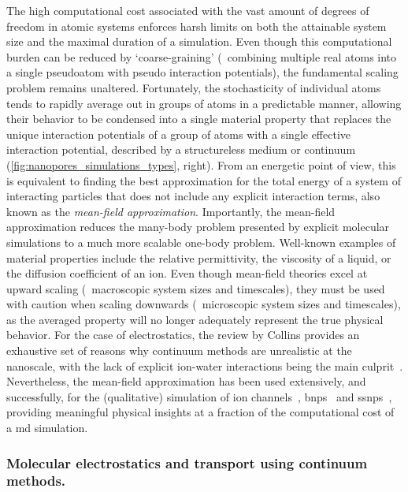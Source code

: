 The high computational cost associated with the vast amount of degrees of freedom in atomic systems enforces
harsh limits on both the attainable system size and the maximal duration of a simulation. Even though this
computational burden can be reduced by `coarse-graining' (\ie~combining multiple real atoms into a single
pseudoatom with pseudo interaction potentials), the fundamental scaling problem remains unaltered.
Fortunately, the stochasticity of individual atoms tends to rapidly average out in groups of atoms in a
predictable manner, allowing their behavior to be condensed into a single material property that replaces the
unique interaction potentials of a group of atoms with a single effective interaction potential, described by
a structureless medium or continuum (\cref{fig:nanopores_simulations_types}, right). From an energetic
point of view, this is equivalent to finding the best approximation for the total energy of a system of
interacting particles that does not include any explicit interaction terms, also known as the \emph{mean-field
approximation}. Importantly, the mean-field approximation reduces the many-body problem presented by explicit
molecular simulations to a much more scalable one-body problem. Well-known examples of material properties
include the relative permittivity, the viscosity of a liquid, or the diffusion coefficient of an ion. Even
though mean-field theories excel at upward scaling (\ie~macroscopic system sizes and timescales), they must be
used with caution when scaling downwards (\ie~microscopic system sizes and timescales), as the averaged
property will no longer adequately represent the true physical behavior. For the case of electrostatics, the
review by Collins provides an exhaustive set of reasons why continuum methods are unrealistic at the
nanoscale, with the lack of explicit ion-water interactions being the main culprit~\cite{Collins-2012}.
Nevertheless, the mean-field approximation has been used extensively, and successfully, for the (qualitative)
simulation of ion channels~\cite{Im-2002,Furini-2006,Liu-2015},
\glspl{bnp}~\cite{Simakov-2010,Pederson-2015,Aguilella-Arzo-2017,Simakov-2018} and
\glspl{ssnp}~\cite{Cervera-2005,White-2008,Chaudhry-2014,Laohakunakorn-2015}, providing meaningful physical
insights at a fraction of the computational cost of a \gls{md} simulation.


\subsubsection{Molecular electrostatics and transport using continuum methods.}
%

